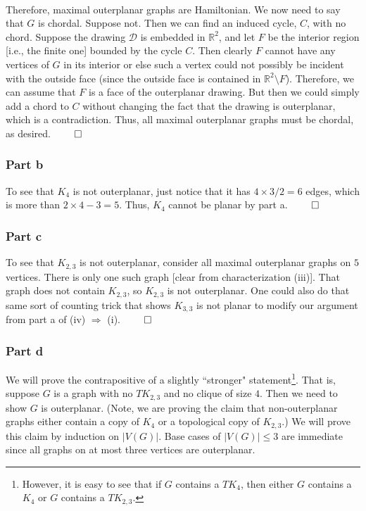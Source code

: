 \documentclass[10pt,a4paper]{article}
\newcommand{\R}{\mathbb{R}}
\newcommand{\Dee}{\mathcal{D}}
\newcommand{\1}{\mathbf{1}}
\begin{document}
\paragraph*{}Therefore, maximal outerplanar graphs are Hamiltonian.  We now need to say that $G$ is chordal.  Suppose not.  Then we can find an induced cycle, $C$, with no chord.  Suppose the drawing $\Dee$ is embedded in $\R ^2$, and let $F$ be the interior region [i.e., the finite one] bounded by the cycle $C$.  Then clearly $F$ cannot have any vertices of $G$ in its interior or else such a vertex could not possibly be incident with the outside face (since the outside face is contained in $\R ^2 \setminus F$).  Therefore, we can assume that $F$ is a face of the outerplanar drawing.  But then we could simply add a chord to $C$ without changing the fact that the drawing is outerplanar, which is a contradiction.  Thus, all maximal outerplanar graphs must be chordal, as desired. $\qed$

\subsubsection*{Part b}
To see that $K_4$ is not outerplanar, just notice that it has $4 \times 3 / 2 = 6$ edges, which is more than $2 \times 4 - 3 = 5$.  Thus, $K_4$ cannot be planar by part a. $\qed$

\subsubsection*{Part c}
To see that $K_{2,3}$ is not outerplanar, consider all maximal outerplanar graphs on $5$ vertices.  There is only one such graph [clear from characterization (iii)].  That graph does not contain $K_{2,3}$, so $K_{2,3}$ is not outerplanar.  One could also do that same sort of counting trick that shows $K_{3,3}$ is not planar to modify our argument from part a of (iv) $\Rightarrow$ (i). $\qed$

\subsubsection*{Part d}
We will prove the contrapositive of a slightly ``stronger" statement\footnote{However, it is easy to see that if $G$ contains a $TK_4$, then either $G$ contains a $K_4$ or $G$ contains a $TK_{2,3}$.}.  That is, suppose $G$ is a graph with no $TK_{2,3}$ and no clique of size $4$.  Then we need to show $G$ is outerplanar.  (Note, we are proving the claim that non-outerplanar graphs either contain a copy of $K_{4}$ or a topological copy of $K_{2,3}$.)  We will prove this claim by induction on $|V(G)|$.  Base cases of $|V(G)| \leq 3$ are immediate since all graphs on at most three vertices are outerplanar.
\end{document}
